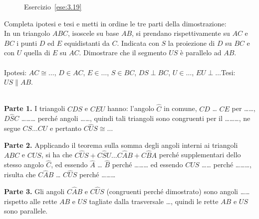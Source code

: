 \begin{inaccessibleblock}
 \begin{figure}[htb]
\centering
\caption{Esercizio~\ref{ese:3.19}}\label{fig:ese3.19}
\end{figure}
\end{inaccessibleblock}

\begin{esercizio}
\label{ese:3.20}
Completa ipotesi e tesi e metti in ordine le tre parti della 
dimostrazione:\\
In un triangolo $ABC$, isoscele su base $AB$, si prendano 
rispettivamente su $AC$ e $BC$ i punti $D$ ed $E$ equidistanti da 
$C$. Indicata con $S$ la proiezione di $D$ su $BC$ e con $U$ quella di 
$E$ su $AC$. Dimostrare che il segmento $US$ è parallelo ad $AB$.\\
~\\
\noindent Ipotesi: $AC\cong \ldots$, $D\in AC$, $E\in \ldots$, $S\in 
BC$, $DS\perp BC$, $U\in \ldots$, $EU\perp \ldots$\hfill Tesi: 
$US\parallel AB$.\\
~\\
\noindent\begin{minipage}{.75\textwidth}
\textbf{Parte 1.} I triangoli $CDS$ e $CEU$  hanno: l'angolo 
$\widehat{C}$ in comune, $CD$ \ldots{} $CE$ per \ldots\ldots{}, 
$D\widehat{S}C$ \ldots\ldots\ldots{} perché angoli \ldots\ldots{}, 
quindi tali triangoli sono congruenti per il \ldots\ldots\ldots{}, ne 
segue $CS \ldots CU$ e pertanto $C\widehat{U}S\cong \ldots$\par

\textbf{Parte 2.} Applicando il teorema sulla somma degli angoli 
interni ai triangoli $ABC$ e $CUS$, si ha che $C\widehat{U}S + 
C\widehat{S}U \ldots{} C\widehat{A}B + C\widehat{B}A$ perché 
supplementari dello stesso angolo $\widehat{C}$, ed essendo 
$\widehat{A}$ \dots{} $\widehat{B}$ perché \ldots\ldots\ldots{} ed 
essendo $C\widehat{U}S$ \ldots\ldots{} perché \ldots\ldots\ldots{}, 
risulta che $C\widehat{A}B$ \ldots{} $C\widehat{U}S$ perché 
\ldots\ldots\ldots{}\par

\textbf{Parte 3.} Gli angoli $C\widehat{A}B$ e $C\widehat{U}S$ 
(congruenti perché dimostrato) sono angoli \ldots\ldots rispetto alle 
rette $AB$ e $US$ tagliate dalla trasversale \ldots, quindi le rette 
$AB$ e $US$ sono parallele.
\end{minipage}\hfil
\begin{minipage}{.25\textwidth}
\centering
\end{minipage}
\end{esercizio}

